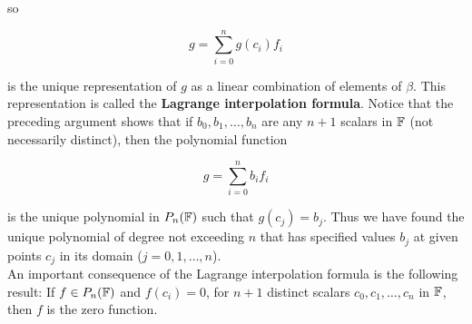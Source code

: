 \begin{definition}
	so

	\[g=\sum_{i=0}^{n}g(c_i)f_i\]

	is the unique representation of $g$ as a linear combination of elements of $\beta$. This representation is called the \textbf{Lagrange interpolation formula}. Notice that the preceding argument shows that if $b_0, b_1, \dots, b_n$ are any $n+1$ scalars in $\mathbb{F}$ (not necessarily distinct), then the polynomial function

	\[g = \sum_{i=0}^{n}b_if_i\]

	is the unique polynomial in $P_n(\mathbb{F})$ such that $g(c_j) = b_j$. Thus we have found the unique polynomial of degree not exceeding $n$ that has specified values $b_j$ at given points $c_j$ in its domain ($j = 0, 1, \dots, n$).\\

	An important consequence of the Lagrange interpolation formula is the following result: If $f \in P_n(\mathbb{F})$ and $f(c_i) = 0$, for $n+1$ distinct scalars $c_0, c_1, \dots, c_n$ in $\mathbb{F}$, then $f$ is the zero function.
\end{definition}
